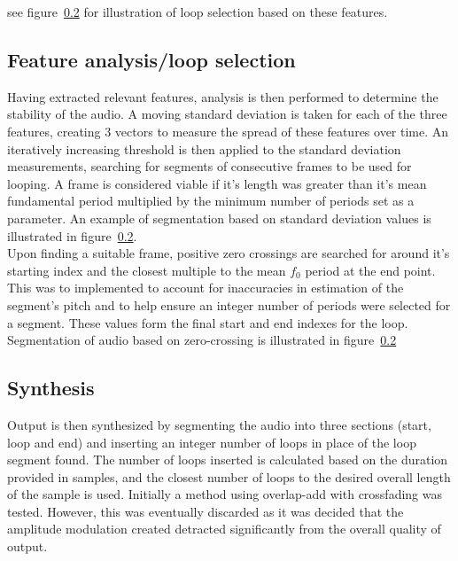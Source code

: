\documentclass[titlepage]{scrartcl}
\begin{document}
see figure~\ref{} for illustration of loop
selection based on these features.
\subsection{Feature analysis/loop selection}
Having extracted relevant features, analysis is then performed to determine the
stability of the audio.  A moving standard deviation is taken for each of the
three features, creating 3 vectors to measure the spread of these features over
time.  An iteratively increasing threshold is then applied to the standard
deviation measurements, searching for segments of consecutive frames to be used
for looping. A frame is considered viable if it's length was greater than it's
mean fundamental period multiplied by the minimum number of periods set as a
parameter. An example of segmentation based on standard deviation values is
illustrated in figure~\ref{}.\\
Upon finding a suitable frame, positive zero crossings are searched for around
it's starting index and the closest multiple to the mean $f_0$ period at the end
point. This was to implemented to account for inaccuracies in estimation of the
segment's pitch and to help ensure an integer number of periods were selected
for a segment. These values form the final start and end indexes for the loop.
Segmentation of audio based on zero-crossing is illustrated in figure~\ref{}

\subsection{Synthesis}
Output is then synthesized by segmenting the audio into three sections (start,
loop and end) and inserting an integer number of loops in place of
the loop segment found. The number of loops inserted is calculated based on the
duration provided in samples, and the closest number of loops to the desired
overall length of the sample is used.
Initially a method using overlap-add with crossfading was tested. However, this
was eventually discarded as it was decided that the amplitude modulation
created detracted significantly from the overall quality of output.
\end{document}
